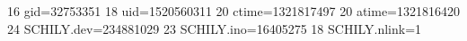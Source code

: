 16 gid=32753351
18 uid=1520560311
20 ctime=1321817497
20 atime=1321816420
24 SCHILY.dev=234881029
23 SCHILY.ino=16405275
18 SCHILY.nlink=1

